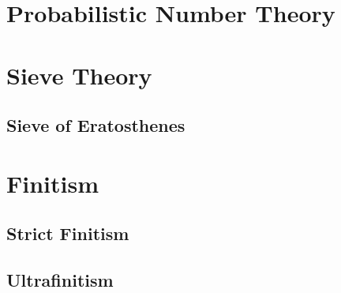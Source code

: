 \section{Probabilistic Number Theory}\label{sec:probabilistic_number_theory}

\section{Sieve Theory}\label{sec:sieve_theory}

\subsection{Sieve of Eratosthenes}\label{sec:sieve}



\section{Finitism}\label{sec:finitism}

\subsection{Strict Finitism}\label{sec:strict_finitism}

\subsection{Ultrafinitism}\label{sec:ultrafinitism}
